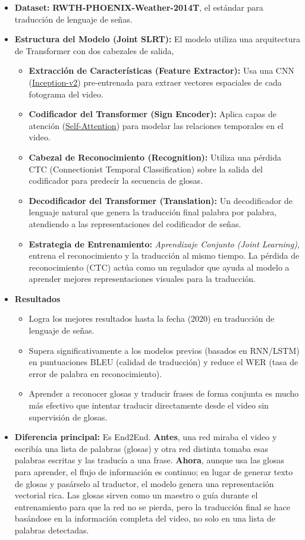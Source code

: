 \documentclass[11pt,a4paper]{article}
\begin{document}
\begin{itemize}
	\item \textbf{Dataset:} \textbf{RWTH-PHOENIX-Weather-2014T}, el estándar para traducción de lenguaje de señas.
	\item \textbf{Estructura del Modelo (Joint SLRT):} El modelo utiliza una arquitectura de Transformer con dos cabezales de salida,
	\begin{itemize}
		\item \textbf{Extracción de Características (Feature Extractor):} Usa una CNN (\href{https://github.com/LKLQQ/Inception-v2}{Inception-v2}) pre-entrenada para extraer vectores espaciales de cada fotograma del video.
		\item \textbf{Codificador del Transformer (Sign Encoder):} Aplica capas de atención (\href{https://www.ibm.com/es-es/think/topics/self-attention}{Self-Attention}) para modelar las relaciones temporales en el video.
		\item \textbf{Cabezal de Reconocimiento (Recognition):} Utiliza una pérdida CTC (Connectionist Temporal Classification) sobre la salida del codificador para predecir la secuencia de glosas.
		\item \textbf{Decodificador del Transformer (Translation):} Un decodificador de lenguaje natural que genera la traducción final palabra por palabra, atendiendo a las representaciones del codificador de señas.
		\item \textbf{Estrategia de Entrenamiento:} \emph{Aprendizaje Conjunto (Joint Learning)}, entrena el reconocimiento y la traducción al mismo tiempo. La pérdida de reconocimiento (CTC) actúa como un regulador que ayuda al modelo a aprender mejores representaciones visuales para la traducción.
	\end{itemize}
	\item \textbf{Resultados}
	\begin{itemize}
		\item Logra los mejores resultados hasta la fecha (2020) en traducción de lenguaje de señas.
		\item Supera significativamente a los modelos previos (basados en RNN/LSTM) en puntuaciones BLEU (calidad de traducción) y reduce el WER (tasa de error de palabra en reconocimiento).
		\item Aprender a reconocer glosas y traducir frases de forma conjunta es mucho más efectivo que intentar traducir directamente desde el video sin supervisión de glosas.
	\end{itemize}
	\item \textbf{Diferencia principal:} Es End2End. \textbf{Antes}, una red miraba el video y escribía una lista de palabras (glosas) y otra red distinta tomaba esas palabras escritas y las traducía a una frase. \textbf{Ahora}, aunque usa las glosas para aprender, el flujo de información es continuo; en lugar de generar texto de glosas y pasárselo al traductor, el modelo genera una representación vectorial rica. Las glosas sirven como un maestro o guía durante el entrenamiento para que la red no se pierda, pero la traducción final se hace basándose en la información completa del video, no solo en una lista de palabras detectadas.
\end{itemize}
\end{document}
